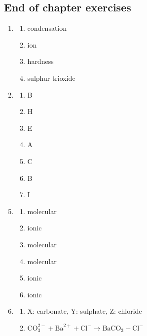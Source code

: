 \subsection{End of chapter exercises}
\begin{multicols}{3}
 \begin{enumerate}[noitemsep, label=\textbf{(\arabic*)} ]
  \item 
\begin{enumerate}[noitemsep, label=\textbf{(\alph*)} ]
\item condensation
\item ion
\item hardness
\item sulphur trioxide
\end{enumerate}
\item 
\begin{enumerate}[noitemsep, label=\textbf{(\alph*)} ]
\item B
\item H
\item E
\item A
\item C
\item B
\item I
\end{enumerate}
\end{enumerate}
\begin{enumerate}[noitemsep, label=\textbf{(\arabic*)} ]
\setcounter{enumi}{4}
 \item 
\begin{enumerate}[noitemsep, label=\textbf{(\alph*)} ]
\item molecular
\item ionic
\item molecular
\item molecular
\item ionic
\item ionic
\end{enumerate}
\item 
\begin{enumerate}[noitemsep, label=\textbf{(\alph*)} ]
\item X: carbonate, Y: sulphate, Z: chloride
\item $\text{CO}_{3}^{2-} + \text{Ba}^{2+} + \text{Cl}^{-} \to \text{BaCO}_{3} + \text{Cl}^{−}$
\end{enumerate}
\end{enumerate}

\end{multicols}

